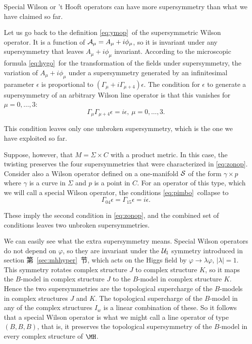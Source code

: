 \par{}

Special Wilson or 't Hooft operators can have more supersymmetry
than what we have claimed so far.

Let us go back to the definition \eqref{eq:ymop}\ of the supersymmetric
Wilson operator.  It is a function of ${\cal
A}_\mu=A_\mu+i\phi_\mu$, so it is invariant under any
supersymmetry that leaves $A_\mu+i\phi_\mu$ invariant. According
to the microscopic formula \eqref{eq:hygo}\ for the transformation of the
fields under supersymmetry, the variation of $A_\mu+i\phi_\mu$
under a supersymmetry generated by an infinitesimal parameter
$\epsilon$ is proportional to
$(\Gamma_\mu+i\Gamma_{\mu+4})\epsilon$.  The condition for
$\epsilon$ to generate a supersymmetry of an arbitrary Wilson line
operator is that this vanishes for $\mu=0,\dots,3$:
\setcounter{equation}{29}
\begin{equation}\label{eq:pimbo}
\Gamma_{\mu}\Gamma_{\mu+4}\epsilon=i\epsilon,~\mu=0,\dots,3.
\end{equation}

This condition leaves only one unbroken supersymmetry, which is
the one we have exploited so far.

Suppose, however, that $M=\Sigma\times C$ with a product metric.
In this case, the twisting preserves the four supersymmetries that
were characterized in \eqref{eq:zonop}.  Consider also a Wilson operator
defined on a one-manifold ${{\cal S}}$ of the form $\gamma\times
p$ where $\gamma$ is a curve in $\Sigma$ and $p$ is a point in
$C$. For an operator of this type, which we will call a special
Wilson operator, the conditions \eqref{eq:pimbo}\ collapse to
\setcounter{equation}{30}
\begin{equation}\label{eq:relfo}
\Gamma_{04}\epsilon=\Gamma_{15}\epsilon=i\epsilon.
\end{equation}

These imply the second condition in \eqref{eq:zonop}, and the combined set
of conditions leaves two unbroken supersymmetries.

We can easily see what the extra supersymmetry means.  Special
Wilson operators do not depend on $\varphi$, so they are invariant
under the ${\cal U}_1$ symmetry introduced in section 第~\ref{sec:mhhyper}~节,
which acts on the Higgs field by $\varphi\to\lambda\varphi$,
$|\lambda|=1$. This symmetry rotates complex structure $J$ to
complex structure $K$, so it maps the $B$-model in complex
structure $J$ to the $B$-model in complex structure $K$.  Hence
the two supersymmetries are the topological supercharge of the
$B$-models in complex structures $J$ and $K$.  The topological
supercharge of the $B$-model in any of the complex structures
$I_w$ is a linear combination of these.  So it follows that a
special Wilson operator is what we might call a line operator of
type $(B,B,B)$, that is, it preserves the topological
supersymmetry of the $B$-model in every complex structure of
$\MH$.

